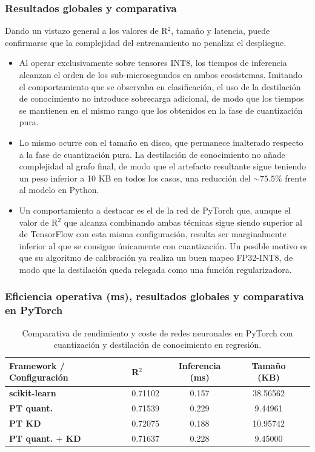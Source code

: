 \documentclass[a4paper,12pt,twoside,final]{book}
\begin{document}
\subsubsection{Resultados globales y comparativa}
Dando un vistazo general a los valores de R$^2$, tamaño y latencia, puede confirmarse que la complejidad del entrenamiento
no penaliza el despliegue.
\begin{itemize}
  \item Al operar exclusivamente sobre tensores INT8, los tiempos de inferencia alcanzan el orden de los
  sub-microsegundos en ambos ecosistemas. Imitando el comportamiento que se observaba en clasificación, el uso de la
  destilación de conocimiento no introduce sobrecarga adicional, de modo que los tiempos se mantienen en el mismo rango
  que los obtenidos en la fase de cuantización pura.
  \item Lo mismo ocurre con el tamaño en disco, que permanece inalterado respecto a la fase de cuantización pura. La
  destilación de conocimiento no añade complejidad al grafo final, de modo que el artefacto resultante sigue teniendo un
  peso inferior a 10 KB en todos los casos, una reducción del $\sim 75.5\%$ frente al modelo en Python.
  \item Un comportamiento a destacar es el de la red de PyTorch que, aunque el valor de R$^2$ que alcanza combinando ambas
  técnicas sigue siendo superior al de TensorFlow con esta misma configuración, resulta ser marginalmente inferior al que
  se consigue únicamente con cuantización. Un posible motivo es que su algoritmo de calibración ya realiza un buen mapeo
  FP32-INT8, de modo que la destilación queda relegada como una función regularizadora.
\end{itemize}

\subsubsection{Eficiencia operativa (ms), resultados globales y comparativa en PyTorch}
\begin{table}[htbp]
  \centering
  \begin{tabularx}{\textwidth}{lXccc}
    \hline
    \textbf{Framework / Configuración} & \textbf{R$^2$} & \textbf{Inferencia (ms)} & \textbf{Tamaño (KB)} \\
    \hline
    \textbf{scikit-learn}     & 0.71102  & 0.157 & 38.56562 \\
    \hline
    \textbf{PT quant.}        & 0.71539 & 0.229 & 9.44961   \\
    \textbf{PT KD}            & 0.72075 & 0.188 & 10.95742  \\
    \textbf{PT quant. $+$ KD} & 0.71637 & 0.228 & 9.45000   \\
    \hline
  \end{tabularx}
  \caption{Comparativa de rendimiento y coste de redes neuronales en PyTorch con cuantización y destilación de conocimiento en regresión.}
  \label{tab:pytorch_quant_kd_reg_resumen}
\end{table}
\end{document}
